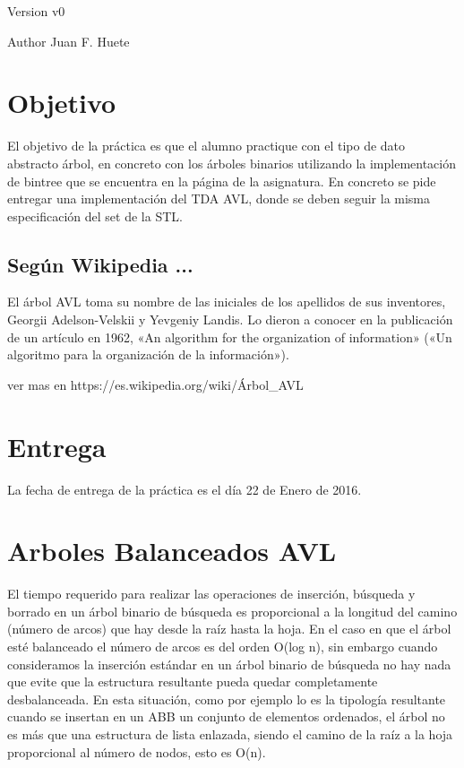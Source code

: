 \begin{DoxyVersion}{Version}
v0 
\end{DoxyVersion}
\begin{DoxyAuthor}{Author}
Juan F. Huete
\end{DoxyAuthor}
\hypertarget{index_Objetivo}{}\section{Objetivo}\label{index_Objetivo}
El objetivo de la práctica es que el alumno practique con el tipo de dato abstracto árbol, en concreto con los árboles binarios utilizando la implementación de bintree que se encuentra en la página de la asignatura. En concreto se pide entregar una implementación del T\+D\+A A\+V\+L, donde se deben seguir la misma especificación del set de la S\+T\+L.\hypertarget{index_wiki}{}\subsection{Según Wikipedia ...}\label{index_wiki}
El árbol A\+V\+L toma su nombre de las iniciales de los apellidos de sus inventores, Georgii Adelson-\/\+Velskii y Yevgeniy Landis. Lo dieron a conocer en la publicación de un artículo en 1962, «\+An algorithm for the organization of information» («\+Un algoritmo para la organización de la información»).


\begin{DoxyCode}
ver mas en https:\textcolor{comment}{//es.wikipedia.org/wiki/Árbol\_AVL}
\end{DoxyCode}
 \hypertarget{index_Fecha}{}\section{Entrega}\label{index_Fecha}
La fecha de entrega de la práctica es el día 22 de Enero de 2016.\hypertarget{index_Documentacion}{}\section{Arboles Balanceados A\+V\+L}\label{index_Documentacion}
El tiempo requerido para realizar las operaciones de inserción, búsqueda y borrado en un árbol binario de búsqueda es proporcional a la longitud del camino (número de arcos) que hay desde la raíz hasta la hoja. En el caso en que el árbol esté balanceado el número de arcos es del orden O(log n), sin embargo cuando consideramos la inserción estándar en un árbol binario de búsqueda no hay nada que evite que la estructura resultante pueda quedar completamente desbalanceada. En esta situación, como por ejemplo lo es la tipología resultante cuando se insertan en un A\+B\+B un conjunto de elementos ordenados, el árbol no es más que una estructura de lista enlazada, siendo el camino de la raíz a la hoja proporcional al número de nodos, esto es O(n).

